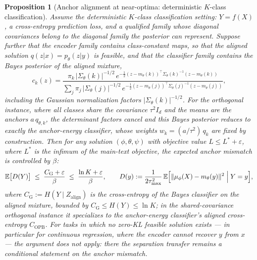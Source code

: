 \documentclass{article}
\theoremstyle{plain}
\newtheorem{proposition}{Proposition}[section]
\theoremstyle{remark}
\newcommand{\E}{\mathbb{E}}
\begin{document}
\begin{proposition}[Anchor alignment at near-optima: deterministic $K$-class classification]
\label{prop:pgib-alignment}
Assume the deterministic $K$-class classification setting: $Y = f(X)$, a
cross-entropy prediction loss, and a qualified family whose diagonal covariances
belong to the diagonal family the posterior can represent. Suppose further that the
encoder family contains class-constant maps, so that the aligned solution
$q(z|x) = p_\theta(z|y)$ is feasible, and that the classifier family contains the
Bayes posterior of the aligned mixture,
\begin{equation}
c_k(z) = \frac{\pi_k\, |\Sigma_\theta(k)|^{-1/2}\, e^{-\frac{1}{2}(z - m_\theta(k))^{\top}\Sigma_\theta(k)^{-1}(z - m_\theta(k))}}
{\sum_j \pi_j\, |\Sigma_\theta(j)|^{-1/2}\, e^{-\frac{1}{2}(z - m_\theta(j))^{\top}\Sigma_\theta(j)^{-1}(z - m_\theta(j))}} ,
\end{equation}
including the Gaussian normalization factors $|\Sigma_\theta(k)|^{-1/2}$. For the
orthogonal instance, where all classes share the covariance $\tau^2 I_d$ and the
means are the anchors $a\,q_{\theta,k}$, the determinant factors cancel and this
Bayes posterior reduces to exactly the anchor-energy classifier, whose weights
$w_k = (a/\tau^2)\,q_k$ are fixed by construction. Then for any solution
$(\phi, \theta, \psi)$ with objective value $L \le L^* + \varepsilon$, where $L^*$
is the infimum of the main-text objective, the expected anchor mismatch is controlled
by $\beta$:
\begin{equation}
\E\bigl[ D(Y) \bigr] \;\le\; \frac{C_{\mathrm{G}} + \varepsilon}{\beta}
\;\le\; \frac{\ln K + \varepsilon}{\beta},
\qquad
D(y) := \frac{1}{2\tau^2_{\max}}\,
\E\Bigl[ \|\mu_\phi(X) - m_\theta(y)\|^2 \;\Big|\; Y = y \Bigr] ,
\end{equation}
where $C_{\mathrm{G}} := H(Y \mid Z_{\mathrm{align}})$ is the cross-entropy of the
Bayes classifier on the aligned mixture, bounded by $C_{\mathrm{G}} \le H(Y) \le
\ln K$; in the shared-covariance orthogonal instance it specializes to the
anchor-energy classifier's aligned cross-entropy $C_{\mathrm{OPB}}$. For tasks in
which no zero-KL feasible solution exists --- in particular for continuous
regression, where the encoder cannot recover $y$ from $x$ --- the argument does not
apply: there the separation transfer remains a conditional statement on the anchor
mismatch.
\end{proposition}
\end{document}
